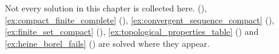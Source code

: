 Not every solution in this chapter is collected here. 
(), \cref{ex:compact_finite_complete}
(), \cref{ex:convergent_sequence_compact}
(), \cref{ex:finite_set_compact}
(), \cref{ex:topological_properties_table}
() and \cref{ex:heine_borel_fails}
() are solved where they appear.

